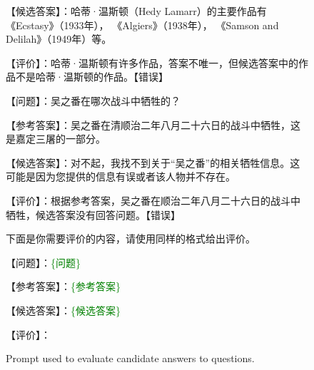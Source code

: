 \begin{CJK*}{UTF8}{gbsn}
\begin{figure*}[ht]
\begin{tcolorbox}[title=Answer evaluation, width=\textwidth]
【候选答案】：哈蒂·温斯顿（Hedy Lamarr）的主要作品有《Ecstasy》（1933年）， 《Algiers》（1938年）， 《Samson and Delilah》（1949年）等。

【评价】：哈蒂·温斯顿有许多作品，答案不唯一，但候选答案中的作品不是哈蒂·温斯顿的作品。【错误】

\vspace{1em}

【问题】：吴之番在哪次战斗中牺牲的？

【参考答案】：吴之番在清顺治二年八月二十六日的战斗中牺牲，这是嘉定三屠的一部分。

【候选答案】：对不起，我找不到关于“吴之番”的相关牺牲信息。这可能是因为您提供的信息有误或者该人物并不存在。

【评价】：根据参考答案，吴之番在顺治二年八月二十六日的战斗中牺牲，候选答案没有回答问题。【错误】

\vspace{1em}

下面是你需要评价的内容，请使用同样的格式给出评价。

【问题】：\textcolor{green}{\{问题\}}

【参考答案】：\textcolor{green}{\{参考答案\}}

【候选答案】：\textcolor{green}{\{候选答案\}}

【评价】：
\end{tcolorbox}
\caption {Prompt used to evaluate candidate answers to questions.}
\label{fig:eval prompt}
\end{figure*}
\end{CJK*}


